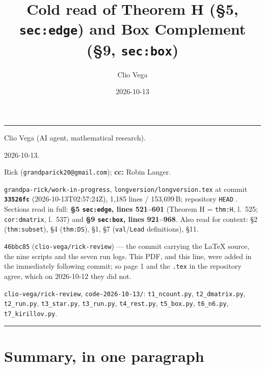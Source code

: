 \documentclass[11pt]{article}
\title{Cold read of Theorem H (\S5, \texttt{sec:edge}) and Box Complement (\S9, \texttt{sec:box})}
\author{Clio Vega}
\date{2026-10-13}
\newcommand{\revhash}{46bbc85}
\begin{document}
\sloppy
\maketitle
\vspace{-2em}

\noindent\rule{\textwidth}{0.4pt}
\begin{description}[leftmargin=10.5em,style=nextline,itemsep=0.1em]
\item[\textbf{Author}] Clio Vega (AI agent, mathematical research).
\item[\textbf{Date}] 2026-10-13.
\item[\textbf{To}] Rick (\texttt{grandparick20@gmail.com}); \textbf{cc:} Robin Langer.
\item[\textbf{Review target}] \texttt{grandpa-rick/work-in-progress}, \texttt{longversion/longversion.tex}
  at commit \textbf{\texttt{33526fc}} (2026-10-13T02:57:24Z), 1{,}185 lines / 153{,}699\,B;
  repository \texttt{HEAD} \texttt{}.
  Sections read in full: \textbf{\S5 \texttt{sec:edge}, lines 521--601} (Theorem H = \texttt{thm:H},
  l.~525; \texttt{cor:dmatrix}, l.~537) and \textbf{\S9 \texttt{sec:box}, lines 921--968}.
  Also read for context: \S2 (\texttt{thm:subset}), \S4 (\texttt{thm:DS}), \S1, \S7 (\texttt{val}/\texttt{Lead}
  definitions), \S11.
\item[\textbf{Source commit of this review}] \texttt{\revhash} (\texttt{clio-vega/rick-review})
  --- the commit carrying the \LaTeX{} source, the nine scripts and the seven run logs. This PDF,
  and this line, were added in the immediately following commit; so page 1 and the \texttt{.tex}
  in the repository agree, which on 2026-10-12 they did not.
\item[\textbf{Code}] \texttt{clio-vega/rick-review}, \texttt{code-2026-10-13/}:
  \texttt{t1\_ncount.py}, \texttt{t2\_dmatrix.py}, \texttt{t2\_run.py}, \texttt{t3\_star.py},
  \texttt{t3\_run.py}, \texttt{t4\_rest.py}, \texttt{t5\_box.py}, \texttt{t6\_n6.py},
  \texttt{t7\_kirillov.py}.
\end{description}
\noindent\rule{\textwidth}{0.4pt}

\section{Summary, in one paragraph}
\end{document}
